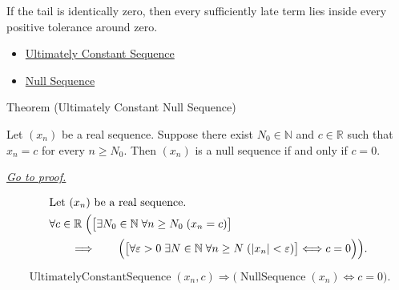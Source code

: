 \begin{remark*}[Interpretation]
If the tail is identically zero, then every sufficiently late term lies inside
every positive tolerance around zero.
\end{remark*}

\begin{dependencies}
\begin{itemize}
  \item \hyperref[def:ultimately-constant-sequence]{Ultimately Constant Sequence}
  \item \hyperref[def:null-sequence]{Null Sequence}
\end{itemize}
\end{dependencies}


\begin{theorembox}{Theorem (Ultimately Constant Null Sequence)}
\begin{theorem}
\label{thm:ultimately-constant-null-sequence}
Let $(x_n)$ be a real sequence. Suppose there exist $N_0 \in \mathbb{N}$
and $c \in \mathbb{R}$ such that $x_n = c$ for every $n \ge N_0$. Then
$(x_n)$ is a null sequence if and only if $c = 0$.

\smallskip
\noindent
\hyperref[prf:ultimately-constant-null-sequence]{\textit{Go to proof.}}
\end{theorem}
\end{theorembox}

\begin{remark*}
\[
\begin{aligned}
&\text{Let } (x_n) \text{ be a real sequence.}\\
&\forall c \in \mathbb{R}\;
\Bigl(
\bigl[
\exists N_0 \in \mathbb{N}\;
\forall n \ge N_0\;(x_n = c)
\bigr]\\
&\qquad\Longrightarrow\qquad
\Bigl(
\bigl[
\forall \varepsilon > 0\;
\exists N \in \mathbb{N}\;
\forall n \ge N\;(|x_n| < \varepsilon)
\bigr]
\Longleftrightarrow c = 0
\Bigr)
\Bigr).
\end{aligned}
\]
\end{remark*}

\begin{remark*}
\[
\operatorname{UltimatelyConstantSequence}(x_n,c)
\Longrightarrow
\bigl(\operatorname{NullSequence}(x_n) \Longleftrightarrow c = 0\bigr).
\]
\end{remark*}

